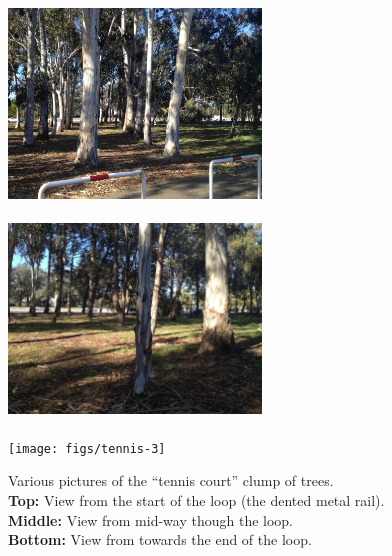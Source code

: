 \documentclass[12pt,oneside,a4paper]{book}
\begin{document}
\begin{figure}
  \centering
  \includegraphics[width=0.6\textwidth]{figs/tennis-1}\\
  ~\\
  \includegraphics[width=0.6\textwidth]{figs/tennis-2}\\
  ~\\
  \texttt{[image: figs/tennis-3]}\\
  \caption{Various pictures of the ``tennis court'' clump of trees.\\
  \textbf{Top:} View from the start of the loop (the dented metal
  rail).\\
  \textbf{Middle:} View from mid-way though the loop.\\
  \textbf{Bottom:} View from towards the end of the loop.}
  \label{fig:tennis-trees}
\end{figure}
\end{document}
